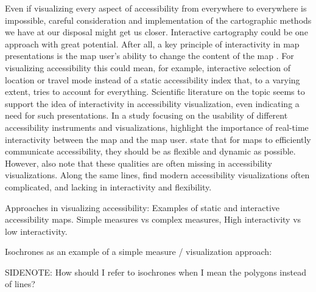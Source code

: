 Even if visualizing every aspect of accessibility
from everywhere to everywhere is impossible,
careful consideration and implementation
of the cartographic methods we have at our disposal might get us closer.
Interactive cartography could be one approach with great potential.
After all, a key principle of interactivity in map presentations is
the map user's ability to change the content of the map \parencite{rot2013b}.
For visualizing accessibility this could mean, for example,
interactive selection of location or travel mode instead of
a static accessibility index that, to a varying extent,
tries to account for everything.
Scientific literature on the topic seems to support the idea of
interactivity in accessibility visualization,
even indicating a need for such presentations.
In a study focusing on the usability of
different accessibility instruments and visualizations,  %
\textcite{te2014} highlight the importance of
real-time interactivity between the map and the map user.
\textcite{but2018} state that for maps to efficiently communicate accessibility,
they should be as flexible and dynamic as possible.
However, \textcite{but2018} also note that
these qualities are often missing in accessibility visualizations.
Along the same lines,
\textcite{paj2021} find modern accessibility visualizations often complicated,
and lacking in interactivity and flexibility.


Approaches in visualizing accessibility:
Examples of static and interactive accessibility maps.
Simple measures vs complex measures,
High interactivity vs low interactivity.

Isochrones as an example of a simple measure / visualization approach:


SIDENOTE: How should I refer to isochrones when I mean the polygons instead of lines?



